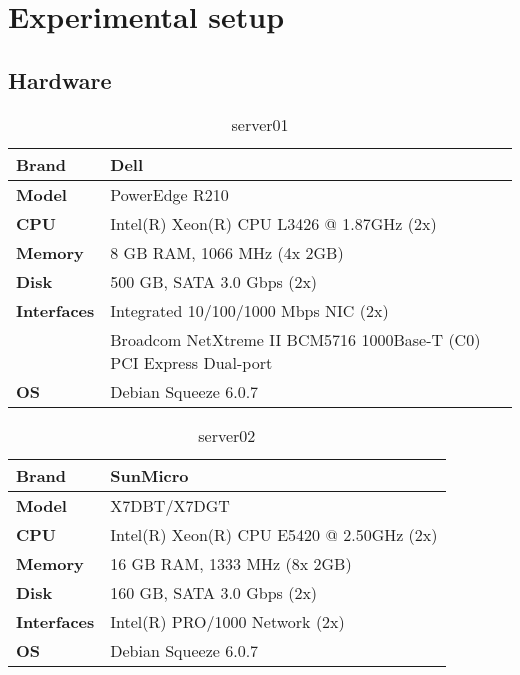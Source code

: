 \documentclass[Configuration]{subfiles}
\begin{document}
\newpage
\section{Experimental setup}
\label{sec:Experimental setup}

\subsection{Hardware}

\begin{table}[H]
\caption{server01}
\centering
\begin{tabular}{|p{2cm}|p{9cm}|}
\hline
\textbf{Brand} & Dell \\ \hline
\textbf{Model} & PowerEdge R210 \\ \hline
\textbf{CPU} & Intel(R) Xeon(R) CPU L3426 @ 1.87GHz (2x)\\ \hline
\textbf{Memory} & 8 GB RAM, 1066 MHz (4x 2GB) \\ \hline
\textbf{Disk} & 500 GB, SATA 3.0 Gbps (2x)\\ \hline
\textbf{Interfaces} &  Integrated 10/100/1000 Mbps NIC (2x) \\ \hline
 & Broadcom NetXtreme II BCM5716 1000Base-T (C0) PCI Express Dual-port \\ \hline
\textbf{OS} & Debian Squeeze 6.0.7 \\ \hline
\end{tabular}
\end{table}

\begin{table}[H]
\caption{server02}
\centering
\begin{tabular}{|p{2cm}|p{9cm}|}
\hline
\textbf{Brand} & SunMicro \\ \hline
\textbf{Model} & X7DBT/X7DGT \\ \hline
\textbf{CPU} & Intel(R) Xeon(R) CPU E5420 @ 2.50GHz (2x)\\ \hline
\textbf{Memory} & 16 GB RAM, 1333 MHz (8x 2GB) \\ \hline
\textbf{Disk} & 160 GB, SATA 3.0 Gbps (2x)\\ \hline
\textbf{Interfaces} &   Intel(R) PRO/1000 Network (2x) \\ \hline
\textbf{OS} & Debian Squeeze 6.0.7 \\ \hline
\end{tabular}
\end{table}
\end{document}
